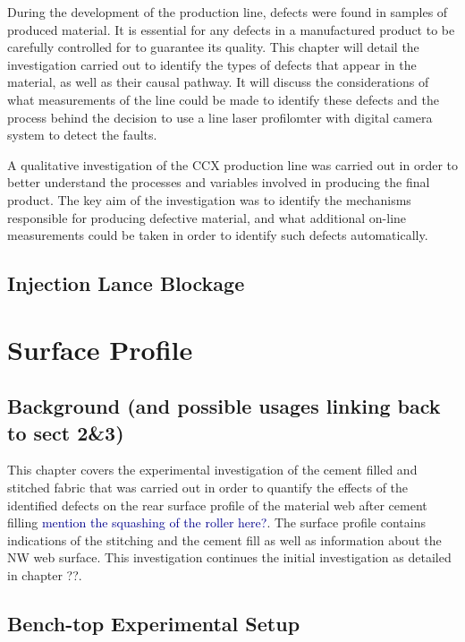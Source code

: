 \documentclass[12pt]{report}
\newcommand{\tcb}[1]{\textcolor{darkBlue}{#1}}
\begin{document}
During the development of the production line, defects were found in samples of produced material. It is essential for any defects in a manufactured product to be carefully controlled for to guarantee its quality. This chapter will detail the investigation carried out to identify the types of defects that appear in the material, as well as their causal pathway. It will discuss the considerations of what measurements of the line could be made to identify these defects and the process behind the decision to use a line laser profilomter with digital camera system to detect the faults.
    
A qualitative investigation of the CCX production line was carried out in order to better understand the processes and variables involved in producing the final product. The key aim of the investigation was to identify the mechanisms responsible for producing defective material, and what additional on-line measurements could be taken in order to identify such defects automatically.
    
    \section{Injection Lance Blockage}
        

\chapter{Surface Profile}


\section{Background (and possible usages linking back to sect 2\&3)}

This chapter covers the experimental investigation of the cement filled and stitched fabric that was carried out in order to quantify the effects of the identified defects on the rear surface profile of the material web after cement filling \tcb{mention the squashing of the roller here?}. The surface profile contains indications of the stitching and the cement fill as well as information about the NW web surface. This investigation continues the initial investigation as detailed in chapter ??. 

\section{Bench-top Experimental Setup}
\end{document}
